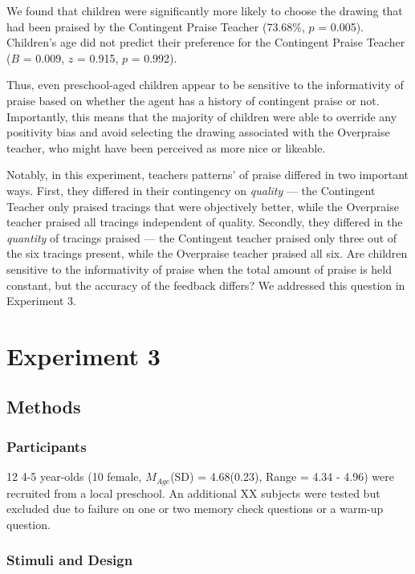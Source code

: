 \documentclass[10pt, letterpaper]{article}
\begin{document}
We found that children were significantly more likely to choose the
drawing that had been praised by the Contingent Praise Teacher (73.68\%,
\(p\) = 0.005). Children's age did not predict their preference for the
Contingent Praise Teacher (\(B\) = 0.009, \(z\) = 0.915, \(p\) = 0.992).

Thus, even preschool-aged children appear to be sensitive to the
informativity of praise based on whether the agent has a history of
contingent praise or not. Importantly, this means that the majority of
children were able to override any positivity bias and avoid selecting
the drawing associated with the Overpraise teacher, who might have been
perceived as more nice or likeable.

Notably, in this experiment, teachers patterns' of praise differed in
two important ways. First, they differed in their contingency on
\emph{quality} --- the Contingent Teacher only praised tracings that
were objectively better, while the Overpraise teacher praised all
tracings independent of quality. Secondly, they differed in the
\emph{quantity} of tracings praised --- the Contingent teacher praised
only three out of the six tracings present, while the Overpraise teacher
praised all six. Are children sensitive to the informativity of praise
when the total amount of praise is held constant, but the accuracy of
the feedback differs? We addressed this question in Experiment 3.

\section{Experiment 3}\label{experiment-3}

\subsection{Methods}\label{methods-2}

\subsubsection{Participants}\label{participants-2}

12 4-5 year-olds (10 female, \(M_{Age}\)(SD) = 4.68(0.23), Range = 4.34
- 4.96) were recruited from a local preschool. An additional XX subjects
were tested but excluded due to failure on one or two memory check
questions or a warm-up question.

\subsubsection{Stimuli and Design}\label{stimuli-and-design}
\end{document}

